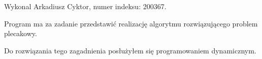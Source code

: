 \-Wykonal \-Arkadiusz \-Cyktor, numer indeksu\-: 200367.

\-Program ma za zadanie przedstawić realizację algorytmu rozwiązującego problem plecakowy.

\-Do rozwiązania tego zagadnienia posłużyłem się programowaniem dynamicznym. 